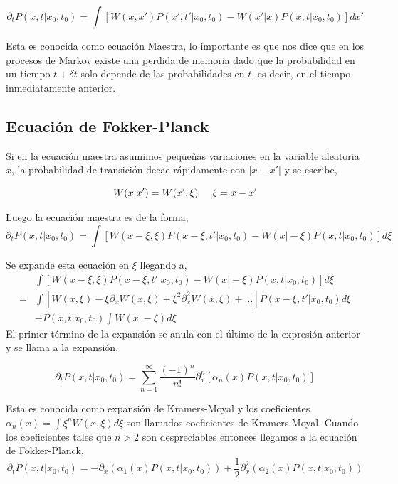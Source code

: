 \documentclass[executivepaper,12pt]{article}
\numberwithin{equation}{section}
\providecommand{\abs}[1]{\lvert#1\rvert}
\begin{document}
\begin{equation*}
	\partial_t P(x,t\rvert x_0,t_0)=\int \left[W(x,x')P(x',t'\rvert x_0,t_0)-W(x'\rvert x)P(x,t\rvert x_0,t_0)\right] dx'
\end{equation*}

Esta es conocida como ecuación Maestra, lo importante es que nos dice que en los procesos de Markov existe una perdida de memoria dado que la probabilidad en un tiempo $t+\delta t$ solo depende de las probabilidades en $t$, es decir, en el tiempo inmediatamente anterior. 

\subsection{Ecuación de Fokker-Planck}

Si en la ecuación maestra asumimos pequeñas variaciones en la variable aleatoria $x$, la probabilidad de transición decae rápidamente con $\abs{x-x'}$ \parencite{wio2013} y se escribe,



\begin{equation*}
	W(x\rvert x')=W(x',\xi) \hspace{0.5cm} \xi =x-x'
\end{equation*}

Luego la ecuación maestra es de la forma,
\begin{equation*}
	\partial_t P(x,t\rvert x_0,t_0)=\int \left[W(x-\xi,\xi)P(x-\xi,t'\rvert x_0,t_0)-W(x\rvert -\xi)P(x,t\rvert x_0,t_0)\right] d\xi
\end{equation*}

Se expande esta ecuación en $\xi$ llegando a,
\begin{align*}
	&\int \left[W(x-\xi,\xi)P(x-\xi,t'\rvert x_0,t_0)-W(x\rvert -\xi)P(x,t\rvert x_0,t_0)\right] d\xi\\
	=&\int [W(x,\xi)-\xi \partial_x W(x,\xi)+\xi^2 \partial_x^2 W(x,\xi)+...]P(x-\xi,t'\rvert x_0,t_0)d\xi \\
	& -P(x,t\rvert x_0,t_0)\int W(x\rvert -\xi)  d\xi
\end{align*}
El primer término de la expansión se anula con el último de la expresión anterior y se llama a la expansión,

\begin{equation*}
	\partial_t P(x,t\rvert x_0,t_0)=\sum_{n=1}^{\infty} \frac{(-1)^n}{n!}\partial^n_x \left[\alpha_n (x) P(x,t\rvert x_0,t_0)\right]
\end{equation*}

Esta es conocida como expansión de Kramers-Moyal y los coeficientes $\alpha_n(x)=\int \xi ^n W(x,\xi)d\xi$ son llamados coeficientes de Kramers-Moyal. Cuando los coeficientes tales que $n>2$ son despreciables entonces llegamos a la ecuación de Fokker-Planck,
\begin{equation*}
	\partial_t P(x,t \rvert x_0,t_0)=-\partial_x(\alpha_1(x)P(x,t\rvert x_0,t_0))+\frac{1}{2}\partial_x ^2(\alpha_2(x)P(x,t\rvert x_0,t_0))
\end{equation*}
\end{document}
